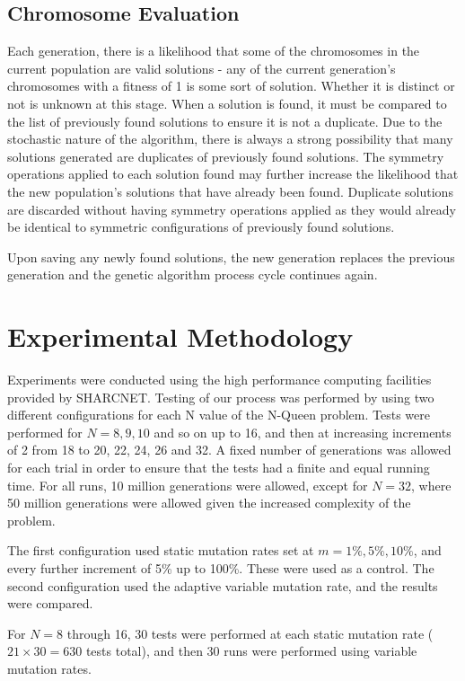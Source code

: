 \documentclass[conference]{IEEEtran}
\begin{document}
\subsection{Chromosome Evaluation}
Each generation, there is a likelihood that some of the chromosomes in the current population are valid solutions - any of the current generation's chromosomes with a fitness of 1 is some sort of solution. Whether it is distinct or not is unknown at this stage. When a solution is found, it must be compared to the list of previously found solutions to ensure it is not a duplicate. Due to the stochastic nature of the algorithm, there is always a strong possibility that many solutions generated are duplicates of previously found solutions. The symmetry operations applied to each solution found may further increase the likelihood that the new population's solutions that have already been found. Duplicate solutions are discarded without having symmetry operations applied as they would already be identical to symmetric configurations of previously found solutions.

Upon saving any newly found solutions, the new generation replaces the previous generation and the genetic algorithm process cycle continues again.

\section{Experimental Methodology}
Experiments were conducted using the high performance computing facilities provided by SHARCNET. Testing of our process was performed by using two different configurations for each N value of the N-Queen problem. Tests were performed for $N = 8, 9, 10$ and so on up to 16, and then at increasing increments of 2 from 18 to 20, 22, 24, 26 and 32. A fixed number of generations was allowed for each trial in order to ensure that the tests had a finite and equal running time. For all runs, 10 million generations were allowed, except for $N = 32$, where 50 million generations were allowed given the increased complexity of the problem.

The first configuration used static mutation rates set at $m = 1\%, 5\%, 10\%$, and every further increment of 5\% up to 100\%. These were used as a control. The second configuration used the adaptive variable mutation rate, and the results were compared. 

For $N = 8$ through 16, 30 tests were performed at each static mutation rate ($21 \times 30 = 630$ tests total), and then 30 runs were performed using variable mutation rates. 
\end{document}

